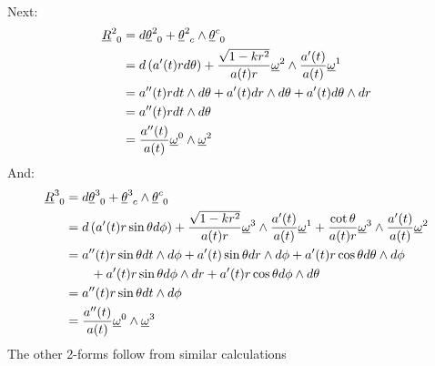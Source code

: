 \documentclass[12pt,a4]{article}
\begin{document}
\begin{enumerate}
\begin{align*}
    \end{align*}
    Next:
    \begin{align*}
      \tensor{\underline{R}}{^2_0} &= d \tensor{\underline{\theta}}{^2_0} + \tensor{\underline{\theta}}{^2_c} \wedge \tensor{\underline{\theta}}{^c_0}\\
                                   &= d \left(a'(t) r d \theta \right) + \frac{\sqrt{1 - k r^2}}{a(t)r} \underline{\omega}^2 \wedge \frac{a'(t)}{a(t)} \underline{\omega}^1 \\
                                   &= a''(t) r d t \wedge d \theta + a'(t) d r \wedge d \theta + a'(t) d \theta \wedge d r\\
                                   &= a''(t) r d t \wedge d \theta \\
                                   &= \frac{a''(t)}{a(t)} \underline{\omega}^0 \wedge \underline{\omega}^2 
    \end{align*}
    And:
    \begin{align*}
      \tensor{\underline{R}}{^3_0} &= d \tensor{\underline{\theta}}{^3_0} + \tensor{\underline{\theta}}{^3_c} \wedge \tensor{\underline{\theta}}{^c_0}\\
                                   &= d \left(a'(t) r \sin \theta d \phi\right) + \frac{\sqrt{1 - k r^2}}{a(t) r}  \underline{\omega}^3 \wedge \frac{a'(t)}{a(t)} \underline{\omega}^1 + \frac{\cot \theta }{a(t)r} \underline{\omega}^3 \wedge \frac{a'(t)}{a(t)} \underline{\omega}^2\\
                                   &= a''(t) r \sin \theta d t \wedge d \phi + a'(t) \sin \theta dr \wedge d\phi + a'(t) r \cos \theta d \theta \wedge d \phi\\
                                   & \qquad + a'(t) r \sin \theta d\phi \wedge  dr + a'(t)r\cos \theta d \phi \wedge d\theta \\
                                   &= a''(t) r \sin \theta d t \wedge d \phi \\
                                   &= \frac{a''(t)}{a(t)}  \underline{\omega}^0 \wedge \underline{\omega}^3
    \end{align*}
    The other 2-forms follow from similar calculations


\end{enumerate}
\end{document}

